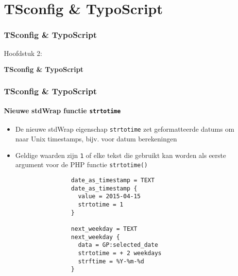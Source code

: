 %

\section{TSconfig \& TypoScript}
\begin{frame}[fragile]
	\frametitle{TSconfig \& TypoScript}

	\begin{center}\huge{Hoofdstuk 2:}\end{center}
	\begin{center}\huge{\color{typo3darkgrey}\textbf{TSconfig \& TypoScript}}\end{center}

\end{frame}

\begin{frame}[fragile]
	\frametitle{TSconfig \& TypoScript}
	\framesubtitle{Nieuwe stdWrap functie \texttt{strtotime}}

	\begin{itemize}

		\item De nieuwe stdWrap eigenschap \texttt{strtotime} zet geformatteerde datums om
			naar Unix timestamps, bijv. voor datum berekeningen

		\item Geldige waarden zijn \texttt{1} of elke tekst die gebruikt kan worden als eerste argument
			voor de PHP functie \texttt{strtotime()}

			\begin{lstlisting}
				date_as_timestamp = TEXT
				date_as_timestamp {
				  value = 2015-04-15
				  strtotime = 1
				}

				next_weekday = TEXT
				next_weekday {
				  data = GP:selected_date
				  strtotime = + 2 weekdays
				  strftime = %Y-%m-%d
				}
			\end{lstlisting}

	\end{itemize}

\end{frame}

